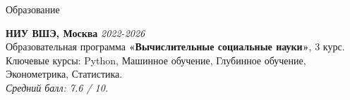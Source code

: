 \documentclass[10pt]{resume} %
\begin{document}
\begin{rSection}{Образование}
	
	\textbf{НИУ ВШЭ, Москва} \hfill \textit{2022-2026} \\ 
	Образовательная программа \textbf{«Вычислительные социальные науки»}, 3 курс. \\
 Ключевые курсы: Python, Машинное обучение, Глубинное обучение, Эконометрика, Статистика. \\
 	\textit{Средний балл: 7.6 / 10.}
	
\end{rSection}

\end{document}
